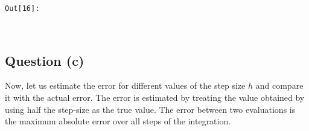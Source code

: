 \documentclass[11pt]{article}
\begin{document}
\texttt{\color{outcolor}Out[{\color{outcolor}16}]:}
    
    \begin{center}
    \end{center}
    { \hspace*{\fill} \\}
    

    \subsection{Question (c)}\label{question-c}

Now, let us estimate the error for different values of the step size
\(h\) and compare it with the actual error. The error is estimated by
treating the value obtained by using half the step-size as the true
value. The error between two evaluations is the maximum absolute error
over all steps of the integration.
\end{document}
